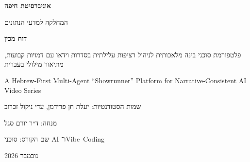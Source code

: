 \begin{titlepage}
  \thispagestyle{empty}
  \centering
  {\Large\bfseries אוניברסיטת חיפה \par}
  {\large המחלקה למדעי הנתונים \par}
  \vspace{1.8cm}
  {\Huge\bfseries דוח מכין \par}
  \vspace{1.4cm}
  {\LARGE פלטפורמת סוכני בינה מלאכותית לניהול רציפות עלילתית בסדרות וידאו עם דמויות קבועות, מתיאור מילולי בעברית \par}
  \vspace{1cm}
  \begin{english}
    {\large A Hebrew-First Multi-Agent ``Showrunner'' Platform for Narrative-Consistent AI Video Series \par}
  \end{english}
  \vspace{1.8cm}
  {\large שמות הסטודנטיות: יעלת חן פרידמן, עדי ניקול זכרוב \par}
  \vspace{0.3cm}
  {\large מנחה: ד״ר יורם סגל \par}
  \vspace{0.3cm}
  {\large שם הקורס: סוכני \textenglish{AI} ו־\mbox{\textenglish{Vibe Coding}} \par}
  \vfill
  {\large נובמבר 2026 \par}
\end{titlepage}
